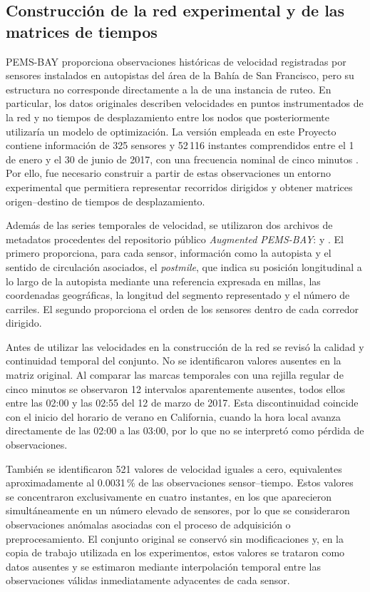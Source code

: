 \documentclass[11pt]{article}
\begin{document}
\subsection{Construcción de la red experimental y de las matrices de tiempos}

PEMS-BAY proporciona observaciones históricas de velocidad registradas por sensores instalados en autopistas del área de la Bahía de San Francisco, pero su estructura no corresponde directamente a la de una instancia de ruteo. En particular, los datos originales describen velocidades en puntos instrumentados de la red y no tiempos de desplazamiento entre los nodos que posteriormente utilizaría un modelo de optimización. La versión empleada en este Proyecto contiene información de 325 sensores y 52\,116 instantes comprendidos entre el 1 de enero y el 30 de junio de 2017, con una frecuencia nominal de cinco minutos \parencite{caltrans_pems,li2018dcrnn}. Por ello, fue necesario construir a partir de estas observaciones un entorno experimental que permitiera representar recorridos dirigidos y obtener matrices origen--destino de tiempos de desplazamiento.

Además de las series temporales de velocidad, se utilizaron dos archivos de metadatos procedentes del repositorio público \textit{Augmented PEMS-BAY}:  y  \parencite{augmented_pems_bay}. El primero proporciona, para cada sensor, información como la autopista y el sentido de circulación asociados, el \textit{postmile}, que indica su posición longitudinal a lo largo de la autopista mediante una referencia expresada en millas, las coordenadas geográficas, la longitud del segmento representado y el número de carriles. El segundo proporciona el orden de los sensores dentro de cada corredor dirigido.

Antes de utilizar las velocidades en la construcción de la red se revisó la calidad y continuidad temporal del conjunto. No se identificaron valores ausentes en la matriz original. Al comparar las marcas temporales con una rejilla regular de cinco minutos se observaron 12 intervalos aparentemente ausentes, todos ellos entre las 02:00 y las 02:55 del 12 de marzo de 2017. Esta discontinuidad coincide con el inicio del horario de verano en California, cuando la hora local avanza directamente de las 02:00 a las 03:00, por lo que no se interpretó como pérdida de observaciones.

También se identificaron 521 valores de velocidad iguales a cero, equivalentes aproximadamente al 0.0031\,\% de las observaciones sensor--tiempo. Estos valores se concentraron exclusivamente en cuatro instantes, en los que aparecieron simultáneamente en un número elevado de sensores, por lo que se consideraron observaciones anómalas asociadas con el proceso de adquisición o preprocesamiento. El conjunto original se conservó sin modificaciones y, en la copia de trabajo utilizada en los experimentos, estos valores se trataron como datos ausentes y se estimaron mediante interpolación temporal entre las observaciones válidas inmediatamente adyacentes de cada sensor.
\end{document}
